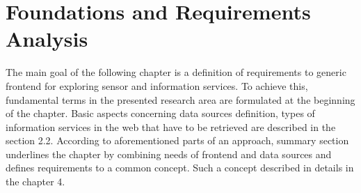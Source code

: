 \chapter{Foundations and Requirements Analysis}
	The main goal of the following chapter is a definition of requirements to generic frontend for exploring sensor and information services. To achieve this, fundamental terms in the presented research area are formulated at the beginning of the chapter. Basic aspects concerning data sources definition, types of information services in the web that have to be retrieved are described in the section 2.2. According to aforementioned parts of an approach, summary section underlines the chapter by combining needs of frontend and data sources and defines requirements to a common concept. Such a concept described in details in the chapter 4.

